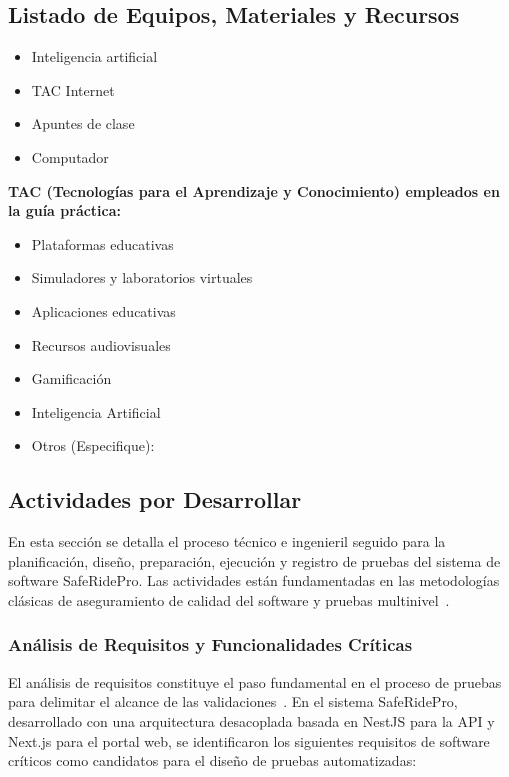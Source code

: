 \documentclass{article}
\newcommand{\checkedbox}{\stackinset{c}{0pt}{c}{0pt}{\checkmark}{$\square$}}
\begin{document}
\subsection{Listado de Equipos, Materiales y Recursos}
\begin{itemize}
    \item Inteligencia artificial
    \item TAC Internet
    \item Apuntes de clase
    \item Computador
\end{itemize}

\textbf{TAC (Tecnologías para el Aprendizaje y Conocimiento) empleados en la guía práctica:}
\begin{itemize}
    \item[\checkedbox] Plataformas educativas
    \item[$\square$] Simuladores y laboratorios virtuales
    \item[$\square$] Aplicaciones educativas
    \item[$\square$] Recursos audiovisuales
    \item[$\square$] Gamificación
    \item[\checkedbox] Inteligencia Artificial
    \item Otros (Especifique): \underline{\hspace{5cm}}
\end{itemize}

\subsection{Actividades por Desarrollar}

En esta sección se detalla el proceso técnico e ingenieril seguido para la planificación, diseño, preparación, ejecución y registro de pruebas del sistema de software SafeRidePro. Las actividades están fundamentadas en las metodologías clásicas de aseguramiento de calidad del software y pruebas multinivel~\cite{pressman2010software, istqb2018syllabus}.

\subsubsection{Análisis de Requisitos y Funcionalidades Críticas}

El análisis de requisitos constituye el paso fundamental en el proceso de pruebas para delimitar el alcance de las validaciones~\cite{sommerville2011software}. En el sistema SafeRidePro, desarrollado con una arquitectura desacoplada basada en NestJS para la API y Next.js para el portal web, se identificaron los siguientes requisitos de software críticos como candidatos para el diseño de pruebas automatizadas:
\end{document}
